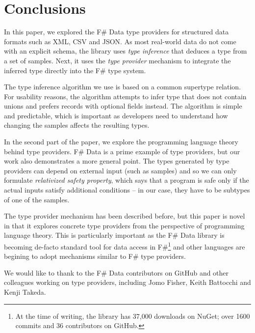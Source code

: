 \documentclass[preprint]{sigplanconf}
\begin{document}
\section{Conclusions}
\label{sec:conclusions}

In this paper, we explored the F\# Data type providers for structured data formats such as XML, CSV and JSON.
As most real-world data do not come with an explicit schema, the library uses \emph{type inference} that
deduces a type from a set of samples. Next, it uses the \emph{type provider} mechanism to integrate the 
inferred type directly into the F\# type system.

The type inference algorithm we use is based on a common supertype relation. For usability reasons, the
algorithm attempts to infer type that does not contain unions and prefers records with optional fields instead.
The algorithm is simple and predictable, which is important as developers need to understand how changing the
samples affects the resulting types.

In the second part of the paper, we explore the programming language theory behind type providers. F\# Data
is a prime example of type providers, but our work also demonstrates a more general point. The types generated
by type providers can depend on external input (such as samples) and so we can only formulate \emph{relativized
safety property}, which says that a program is safe only if the actual inputs satisfy additional conditions --
in our case, they have to be subtypes of one of the samples.

The type provider mechanism has been described before, but this paper is novel in that it explores concrete
type providers from the perspective of programming language theory. This is particularly important as the
F\# Data library is becoming de-facto standard tool for data access in F\#\footnote{At the time of writing, 
the library has 37,000 downloads on NuGet; over 1600 commits and 36 contributors on GitHub.} and other 
languages are begining to adopt mechanisms similar to F\# type providers.

\acks
We would like to thank to the F\# Data contributors on GitHub and other colleagues working on type providers,
including Jomo Fisher, Keith Battocchi and Kenji Takeda.




\end{document}
